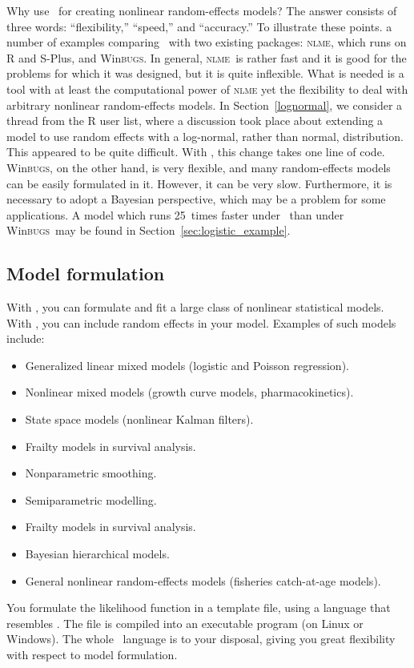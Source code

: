 \documentclass{admbmanual}
\newcommand{\scNLME}{\textsc{nlme}}
\newcommand{\scWinBUGS}{Win\textsc{bugs}}
\begin{document}
Why use \ADM\ for creating nonlinear random-effects models? The answer consists
of three words: ``flexibility,'' ``speed,'' and ``accuracy.'' To illustrate
these points. a number of examples comparing \scAR\ with two existing packages:
\textsc{nlme}, which runs on R and S-Plus, and \scWinBUGS. In general, \scNLME\
is rather fast and it is good for the problems for which it was designed, but it
is quite inflexible. What is needed is a tool with at least the computational
power of \textsc{nlme} yet the flexibility to deal with arbitrary nonlinear
random-effects models. In Section~\ref{lognormal}, we consider a thread from the
R user list, where a discussion took place about extending a model to use random
effects with a log-normal, rather than normal, distribution. This appeared to be
quite difficult. With \scAR, this change takes one line of code. \scWinBUGS, on
the other hand, is very flexible, and many random-effects models can be easily
formulated in it. However, it can be very slow. Furthermore, it is necessary to
adopt a Bayesian perspective, which may be a problem for some applications. A
model which runs 25~times faster under \scAB\ than under \scWinBUGS\ may be
found in Section~\ref{sec:logistic_example}.

\subsection{Model formulation}

With \scAB, you can formulate and fit a large class of nonlinear statistical
models. With \scAR, you can include random effects in your model. Examples of
such models include:
\begin{itemize}
  \item Generalized linear mixed models (logistic and Poisson regression).
  \item Nonlinear mixed models (growth curve models, pharmacokinetics).
  \item State space models (nonlinear Kalman filters).
  \item Frailty models in survival analysis.
  \item Nonparametric smoothing.
  \item Semiparametric modelling.
  \item Frailty models in survival analysis.
  \item Bayesian hierarchical models.
  \item General nonlinear random-effects models (fisheries catch-at-age models).
\end{itemize}
You formulate the likelihood function in a template file, using a language that
resembles \cplus. The file is compiled into an executable program (on Linux or
Windows). The whole \cplus\ language is to your disposal, giving you great
flexibility with respect to model formulation.
\end{document}
